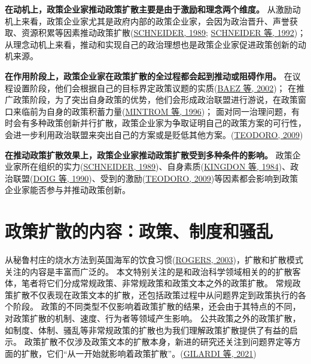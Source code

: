 \documentclass[
  12pt,
]{ctexart}
\begin{document}
\textbf{在动机上，政策企业家推动政策扩散主要是由于激励和理念两个维度。}
从激励动机上来看，政策企业家尤其是政府内部的政策企业家，会因为政治晋升、声誉获取、资源积累等因素推动政策扩散(\protect\hyperlink{ref-Schneider1989}{SCHNEIDER, 1989}; \protect\hyperlink{ref-SchneiderTeske1992}{SCHNEIDER 等, 1992})；
从理念动机上来看，推动和实现自己的政治理想也是政策企业家促进政策创新的动机来源。

\textbf{在作用阶段上，政策企业家在政策扩散的全过程都会起到推动或阻碍作用。}
在议程设置阶段，他们会根据自己的目标界定政策议题的实质(\protect\hyperlink{ref-BaezAbolafia2002}{BAEZ 等, 2002})；
在推广政策阶段，为了突出自身政策的优势，他们会形成政治联盟进行游说，在政策窗口来临前为自身的政策积蓄力量(\protect\hyperlink{ref-MintromVergari1996}{MINTROM 等, 1996})；
面对同一治理问题，有时会有多种政策创新并行扩散，政策企业家为争取证明自己的政策方案的可行性，会进一步利用政治联盟来突出自己的方案或是贬低其他方案。(\protect\hyperlink{ref-Teodoro2009}{TEODORO, 2009})

\textbf{在推动政策扩散效果上，政策企业家推动政策扩散受到多种条件的影响。}
政策企业家所在组织的实力(\protect\hyperlink{ref-Schneider1989}{SCHNEIDER, 1989})、自身素质(\protect\hyperlink{ref-KingdonStano1984a}{KINGDON 等, 1984})、政治联盟(\protect\hyperlink{ref-DoigHargrove1990}{DOIG 等, 1990})、受到的激励(\protect\hyperlink{ref-Teodoro2009}{TEODORO, 2009})等因素都会影响到政策企业家能否参与并推动政策创新。

\newpage

\hypertarget{ux653fux7b56ux6269ux6563ux7684ux5185ux5bb9ux653fux7b56ux5236ux5ea6ux548cux9a9aux4e71}{%
\section{政策扩散的内容：政策、制度和骚乱}\label{ux653fux7b56ux6269ux6563ux7684ux5185ux5bb9ux653fux7b56ux5236ux5ea6ux548cux9a9aux4e71}}

从秘鲁村庄的烧水方法到英国海军的饮食习惯(\protect\hyperlink{ref-Rogers2003}{ROGERS, 2003})，扩散和扩散模式关注的内容是丰富而广泛的。
本文特别关注的是和政治科学领域相关的的扩散客体，笔者将它们分成常规政策、非常规政策和政策文本之外的政策扩散。
常规政策扩散不仅表现在政策文本的扩散，还包括政策过程中从问题界定到政策执行的各个阶段。
政策的不同类型不仅影响着政策扩散的结果，还会由于其特点的不同，对政策扩散的机制、速度、行为者等领域产生影响。
公共政策之外的政策扩散，如制度、体制、骚乱等非常规政策的扩散也为我们理解政策扩散提供了有益的启示。
政策扩散不仅涉及政策文本的扩散本身，新进的研究还关注到问题界定等方面的扩散，它们``从一开始就影响着政策扩散''。(\protect\hyperlink{ref-GilardiEtAl2021}{GILARDI 等, 2021})
\end{document}
